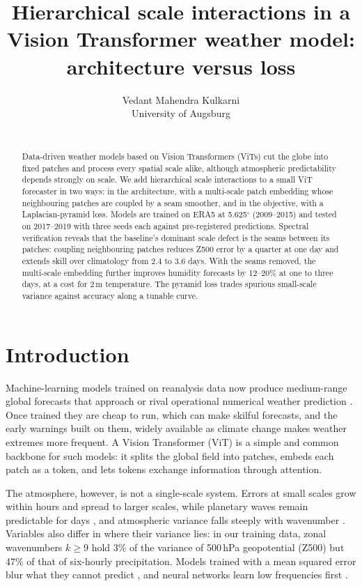 \documentclass{article}
\title{Hierarchical scale interactions in a Vision Transformer weather model: architecture versus loss}
\author{%
  Vedant Mahendra Kulkarni \\
  University of Augsburg \\
  \texttt{\todo{your university e-mail}} \\
}
\begin{document}
\maketitle

\begin{abstract}
Data-driven weather models based on Vision Transformers (ViTs) cut the globe into fixed patches and process every spatial scale alike, although atmospheric predictability depends strongly on scale. We add hierarchical scale interactions to a small ViT forecaster in two ways: in the architecture, with a multi-scale patch embedding whose neighbouring patches are coupled by a seam smoother, and in the objective, with a Laplacian-pyramid loss. Models are trained on ERA5 at 5.625$^\circ$ (2009--2015) and tested on 2017--2019 with three seeds each against pre-registered predictions. Spectral verification reveals that the baseline's dominant scale defect is the seams between its patches: coupling neighbouring patches reduces Z500 error by a quarter at one day and extends skill over climatology from 2.4 to 3.6 days. With the seams removed, the multi-scale embedding further improves humidity forecasts by 12--20\% at one to three days, at a cost for 2\,m temperature. The pyramid loss trades spurious small-scale variance against accuracy along a tunable curve.
\end{abstract}

\section{Introduction}
\label{sec:intro}

Machine-learning models trained on reanalysis data now produce medium-range global forecasts that approach or rival operational numerical weather prediction \cite{lam2023graphcast, bi2023pangu, pathak2022fourcastnet, keisler2022gnn}. Once trained they are cheap to run, which can make skilful forecasts, and the early warnings built on them, widely available as climate change makes weather extremes more frequent. A Vision Transformer (ViT) \cite{dosovitskiy2021vit} is a simple and common backbone for such models: it splits the global field into patches, embeds each patch as a token, and lets tokens exchange information through attention.

The atmosphere, however, is not a single-scale system. Errors at small scales grow within hours and spread to larger scales, while planetary waves remain predictable for days \cite{lorenz1969predictability}, and atmospheric variance falls steeply with wavenumber \cite{nastrom1985climatology}. Variables also differ in where their variance lies: in our training data, zonal wavenumbers $k \geq 9$ hold 3\% of the variance of 500\,hPa geopotential (Z500) but 47\% of that of six-hourly precipitation. Models trained with a mean squared error blur what they cannot predict \cite{subich2025doublepenalty}, and neural networks learn low frequencies first \cite{rahaman2019spectral}.
\end{document}
